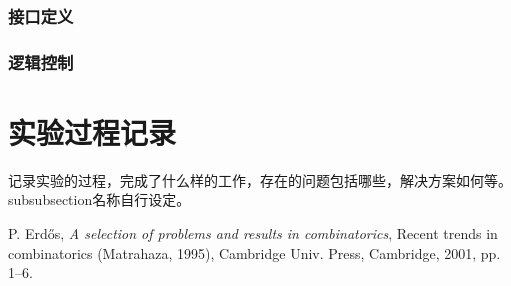 \documentclass[UTF8]{article}
\begin{document}
\subsubsection{接口定义}
\subsubsection{逻辑控制}


\section{实验过程记录}\label{labrec}
记录实验的过程，完成了什么样的工作，存在的问题包括哪些，解决方案如何等。subsubsection名称自行设定。

\appendix

\newpage
\begin{thebibliography}{9}
 P. Erd\H os, \emph{A selection of problems and
results in combinatorics}, Recent trends in combinatorics (Matrahaza,
1995), Cambridge Univ. Press, Cambridge, 2001, pp. 1--6.
\end{thebibliography}
\end{document}

